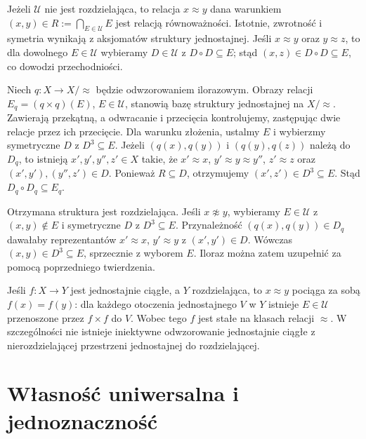 \begin{uwaga}
Jeżeli $\mathcal U$ nie jest rozdzielająca,
to relacja $x\approx y$ dana warunkiem
$(x,y)\in R:=\bigcap_{E\in\mathcal U}E$
jest relacją równoważności. Istotnie,
zwrotność i symetria wynikają z aksjomatów
struktury jednostajnej. Jeśli $x\approx y$
oraz $y\approx z$, to dla dowolnego
$E\in\mathcal U$ wybieramy $D\in\mathcal U$
z $D\circ D\subseteq E$; stąd
$(x,z)\in D\circ D\subseteq E$,
co dowodzi przechodniości.

Niech $q:X\to X/{\approx}$ będzie
odwzorowaniem ilorazowym. Obrazy relacji
$E_q=(q\times q)(E)$, $E\in\mathcal U$,
stanowią bazę struktury jednostajnej
na $X/{\approx}$. Zawierają przekątną,
a odwracanie i przecięcia kontrolujemy,
zastępując dwie relacje przez ich
przecięcie. Dla warunku złożenia,
ustalmy $E$ i wybierzmy symetryczne
$D$ z $D^3\subseteq E$.
Jeżeli $(q(x),q(y))$ i $(q(y),q(z))$
należą do $D_q$, to istnieją
$x',y',y'',z'\in X$ takie, że
$x'\approx x$, $y'\approx y\approx y''$,
$z'\approx z$ oraz
$(x',y'),(y'',z')\in D$.
Ponieważ $R\subseteq D$, otrzymujemy
$(x',z')\in D^3\subseteq E$.
Stąd $D_q\circ D_q\subseteq E_q$.

Otrzymana struktura jest rozdzielająca.
Jeśli $x\not\approx y$, wybieramy
$E\in\mathcal U$ z $(x,y)\notin E$
i symetryczne $D$ z $D^3\subseteq E$.
Przynależność $(q(x),q(y))\in D_q$
dawałaby reprezentantów $x'\approx x$,
$y'\approx y$ z $(x',y')\in D$.
Wówczas $(x,y)\in D^3\subseteq E$,
sprzecznie z wyborem $E$.
Iloraz można zatem uzupełnić
za pomocą poprzedniego twierdzenia.

Jeśli $f:X\to Y$ jest jednostajnie
ciągłe, a $Y$ rozdzielająca, to
$x\approx y$ pociąga za sobą
$f(x)=f(y)$: dla każdego otoczenia
jednostajnego $V$ w $Y$ istnieje
$E\in\mathcal U$ przenoszone przez
$f\times f$ do $V$.
Wobec tego $f$ jest stałe
na klasach relacji $\approx$.
W szczególności nie istnieje
iniektywne odwzorowanie jednostajnie
ciągłe z nierozdzielającej przestrzeni
jednostajnej do rozdzielającej.
\end{uwaga}

\section{Własność uniwersalna i jednoznaczność}
\label{sec:topog-uzupelnienia-uniwersalnosc}

